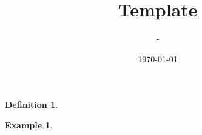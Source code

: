 \documentclass[12pt]{article}
\title{Template}
\author{-}
\date{\today}
\newtheorem{definition}{Definition}
\newtheorem{example}{Example}
\begin{document}
\maketitle

\begin{definition}
\end{definition}

\begin{example}
\end{example}
\end{document}
